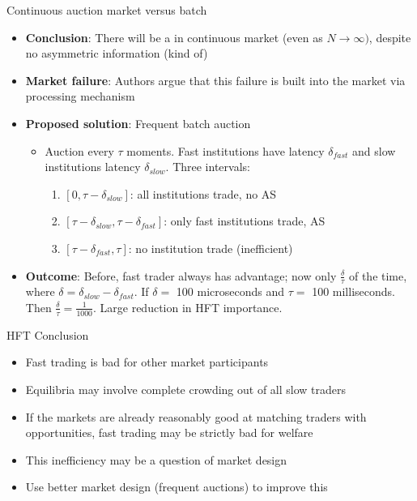 \documentclass[english,10pt
,aspectratio=169
]{beamer}
\begin{document}
\begin{frame}{Continuous auction market versus batch}
	\begin{itemize}
		\item \textbf{Conclusion}: There will be a  in continuous market (even as $N \rightarrow \infty)$, despite \alert{no asymmetric information} (kind of)
		\item \textbf{Market failure}: Authors argue that this failure is built into the market via processing mechanism
		\item \textbf{Proposed solution}: Frequent batch auction
		\begin{itemize}
			\item Auction every $\tau$ moments. Fast institutions have latency $\delta_{fast}$ and slow institutions latency $\delta_{slow}$. Three intervals:
			\begin{enumerate}
				\item  $[0,\tau-\delta_{slow}]$: all institutions trade, no AS
				\item  $[\tau-\delta_{slow},\tau-\delta_{fast}]$: only fast institutions trade, AS
				\item  $[\tau-\delta_{fast},\tau]$: no institution trade (inefficient)
			\end{enumerate}
		\end{itemize}
		\item \textbf{Outcome}: Before, fast trader always has advantage; now only $\frac{\delta}{\tau}$ of the time, where $\delta = \delta_{slow}-\delta_{fast}$. If $\delta=$ 100 microseconds and $\tau=$ 100 milliseconds. Then $\frac{\delta}{\tau}=\frac{1}{1000}$. Large reduction in HFT importance.
	\end{itemize}
\end{frame}


\begin{frame}{HFT Conclusion}
	\begin{itemize}
		\item Fast trading is bad for other market participants
		\item Equilibria may involve complete crowding out of all slow traders
		\item If the markets are already reasonably good at matching traders with opportunities, fast trading may be strictly bad for welfare
		\item This inefficiency may be a question of market design
		\item Use better market design (frequent auctions) to improve this
	\end{itemize}
\end{frame}
\end{document}
